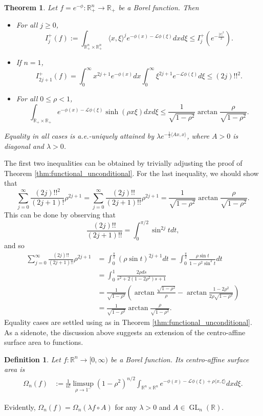 \documentclass[reqno,10pt]{amsart}
\newtheorem{Definition}[Proposition]{Definition}
\newtheorem{Theorem}[Proposition]{Theorem}
\DeclareMathOperator{\GL}{GL}
\newcommand{\R}{\mathbb{R}}
\begin{document}
\begin{Theorem}
	
	Let $f=e^{-\phi}:\R^n_+\to \R_+$ be a Borel function. Then
	\begin{itemize}
		\item For all $j\geq 0$, $$I^+_j(f):=\int_{\R_+^n\times\R_+^n}\langle x,\xi\rangle^{j} e^{-\phi(x)-\mathcal L\phi(\xi)}dx d\xi\leq I^+_j(e^{-\frac{|x|^2}{2}}).$$ 
		\item If $n=1$,  
		$$I_{2j+1}^+(f)=\int_0^\infty x^{2j+1} e^{-\phi(x)}dx  \int_0^\infty \xi^{2j+1}e^{-\mathcal L\phi(\xi)} d\xi\leq (2j)!!^2.$$ 
		\item For all $0\leq \rho<1$, $$\int_{\R_+\times\R_+}e^{-\phi(x)-\mathcal L\phi (\xi)}\sinh (\rho x\xi)dxd\xi\leq\frac{1}{\sqrt{1-\rho^2}}\arctan\frac{\rho}{\sqrt{1-\rho^2}}.$$
	\end{itemize}
	
	Equality in all cases is a.e.-uniquely attained by $\lambda e^{-\frac12 \langle Ax, x\rangle}$, where $A>0$ is diagonal and $\lambda>0$.  
	
\end{Theorem}
\proof
The first two inequalities can be obtained by trivially adjusting the proof of Theorem \ref{thm:functional_unconditional}. For the last inequality, we should show that
$$\sum_{j=0}^\infty\frac{(2j)!!^2}{(2j+1)!}\rho^{2j+1}=\sum_{j=0}^\infty\frac{(2j)!!}{(2j+1)!!}\rho^{2j+1}=\frac{1}{\sqrt{1-\rho^2}}\arctan\frac{\rho}{\sqrt{1-\rho^2}}.$$ This can be done by observing  that
$$ \frac{(2j)!!}{(2j+1)!!}=\int_0^{\pi/2}\sin^{2j}tdt,$$
and so \begin{align*}\sum_{j=0}^\infty\frac{(2j)!!}{(2j+1)!!}\rho^{2j+1}&=\int_{0}^{\frac \pi 2}(\rho\sin t)^{2j+1}dt=\int_0^{\frac \pi 2}\frac{\rho \sin t}{1-\rho^2\sin^2t}dt\\&=\int_0^1 \frac{2\rho ds}{s^2+2(1-2\rho^2)s +1}\\&=\frac{1}{\sqrt{1-\rho^2}}\left(\arctan \frac{\sqrt{1-\rho^2}}{\rho}-\arctan \frac{1-2\rho^2}{2\rho \sqrt{1-\rho^2}}\right)\\&=\frac{1}{\sqrt{1-\rho^2}}\arctan \frac{\rho}{\sqrt{1-\rho^2}}.\end{align*}
Equality cases are settled using \cite{dubuc} as in Theorem \ref{thm:functional_unconditional}.
\endproof
As a sidenote, the discussion above suggests an extension of the centro-affine surface area to functions.

\begin{Definition}
	Let $f:\R^n\to[0,\infty)$ be a Borel function.  Its centro-affine surface area is
	\begin{align*}\Omega_n(f)&:=\frac{1}{n!}\limsup_{\rho\to1^-} (1-\rho^2)^{n/2}\displaystyle\int_{\R^n\times \R^n} e^{-\phi(x)-\mathcal L \phi (\xi)+\rho\langle x,\xi\rangle}dxd\xi.\end{align*}
\end{Definition}
Evidently, $\Omega_n(f)=\Omega_n(\lambda f\circ A)$ for any $\lambda> 0$ and $A\in\GL_n(\R)$.
\end{document}
